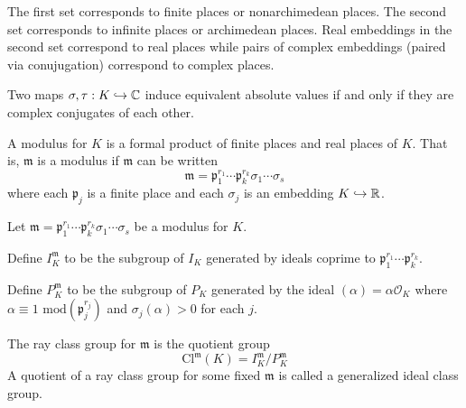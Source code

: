 The first set corresponds to finite places or nonarchimedean places. The second set corresponds to infinite places or archimedean places. Real embeddings in the second set correspond to real places while pairs of complex embeddings (paired via conujugation) correspond to complex places.

\begin{claim}
    Two maps $\sigma,\tau: K \hookrightarrow \mathbb{C}$ induce equivalent absolute values if and only if they are complex conjugates of each other.
\end{claim}

\begin{definition}[Modulus]
    A modulus for $K$ is a formal product of finite places and real places of $K$. That is, $\mathfrak{m}$ is a modulus if $\mathfrak{m}$ can be written
    \[\mathfrak{m} = \mathfrak{p}_1^{r_1}\cdots \mathfrak{p}_k^{r_k}\sigma_1\cdots \sigma_s\]
    where each $\mathfrak{p}_j$ is a finite place and each $\sigma_j$ is an embedding $K \hookrightarrow \mathbb{R}$.
\end{definition}

\begin{definition}

    Let $\mathfrak{m} = \mathfrak{p}_1^{r_1}\cdots \mathfrak{p}_k^{r_k}\sigma_1\cdots \sigma_s$ be a modulus for $K$. 
    
    Define $I_K^\mathfrak{m}$ to be the subgroup of $I_K$ generated by ideals coprime to $\mathfrak{p}_1^{r_1}\cdots \mathfrak{p}_k^{r_k}$.

    Define $P_K^\mathfrak{m}$ to be the subgroup of $P_K$ generated by the ideal $(\alpha) = \alpha \mathcal{O}_{K}$ where $\alpha\equiv 1 \textrm{ mod}(\mathfrak{p}_j^{r_j})$ and $\sigma_j(\alpha)> 0$ for each $j$.

    The ray class group for $\mathfrak{m}$ is the quotient group
        \[\textrm{Cl}^\mathfrak{m}(K) = I_K^\mathfrak{m}/P_K^\mathfrak{m}\]
    A quotient of a ray class group for some fixed $\mathfrak{m}$ is called a generalized ideal class group.
\end{definition}

